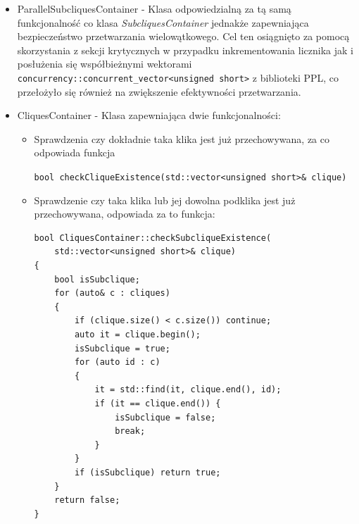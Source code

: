 \documentclass[12pt]{article}
\def\inline{\lstinline[basicstyle=\ttfamily,keywordstyle={}]}
\begin{document}
\begin{itemize}
Weryfikację umożliwia algorytm:
\begin{minipage}{\linewidth}
\begin{lstlisting}[caption={Kod metody checkCliqueExistence klasy SubcliquesContainer}]
bool SubcliquesContainer::checkCliqueExistence(
	std::vector<unsigned short>& clique)
{
	assert(clique.size() >= 2);

	std::vector<bool> types(cliquesCounter, false);
	std::vector<bool> typesNew(cliquesCounter, false);

	for (auto type : typesMap[clique[0]])
	{
		types[type] = true;
	}

	for (auto i = 1; i < clique.size(); ++i)
	{
		for (auto id : typesMap[clique[i]])
		{
			if (types[id]) typesNew[id] = true;
		}
		types = typesNew;
		std::fill(typesNew.begin(), typesNew.end(), false);
	}

	if (std::find(types.begin(), types.end(), true) != types.end())
		return true;

	return false;
}
\end{lstlisting}
\end{minipage}

\item ParallelSubcliquesContainer - Klasa odpowiedzialną za tą samą funkcjonalność co klasa \textit{SubcliquesContainer} jednakże zapewniająca bezpieczeństwo przetwarzania wielowątkowego. Cel ten osiągnięto za pomocą skorzystania z sekcji krytycznych w przypadku inkrementowania licznika jak i posłużenia się współbieżnymi wektorami \inline{concurrency::concurrent_vector<unsigned short>} z biblioteki PPL, co przełożyło się również na zwiększenie efektywności przetwarzania.

\item CliquesContainer - Klasa zapewniająca dwie funkcjonalności:
\begin{itemize}
\item Sprawdzenia czy dokładnie taka klika jest już przechowywana, za co odpowiada funkcja \raggedright \inline{bool checkCliqueExistence(std::vector<unsigned short>& clique)}
\item Sprawdzenie czy taka klika lub jej dowolna podklika jest już przechowywana, odpowiada za to funkcja:
\begin{minipage}{\linewidth}
\begin{lstlisting}[caption={Kod metody checkSublicqueExistence klasy CliquesContainer }]
bool CliquesContainer::checkSubcliqueExistence(
	std::vector<unsigned short>& clique)
{
	bool isSubclique;
  	for (auto& c : cliques)
  	{
		if (clique.size() < c.size()) continue;
    	auto it = clique.begin();
    	isSubclique = true;
        for (auto id : c)
        {
        	it = std::find(it, clique.end(), id);
        	if (it == clique.end()) {
        		isSubclique = false;
        		break;
        	}
        }
   		if (isSubclique) return true;
  	}
  	return false;
}
\end{lstlisting}
\end{minipage}
\end{itemize}


\end{itemize}
\end{document}
